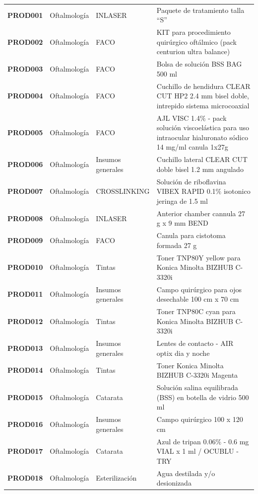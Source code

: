 \begin{longtable}{p{2cm} p{2cm} p{3.1cm} p{6.5cm}}
        \hline
        \textbf{PROD001} & Oftalmología & INLASER & Paquete de tratamiento talla ``S'' \\
        \textbf{PROD002} & Oftalmología & FACO & KIT para procedimiento quirúrgico oftálmico (pack centurion ultra balance) \\
        \textbf{PROD003} & Oftalmología & FACO & Bolsa de solución BSS BAG 500 ml \\
        \textbf{PROD004} & Oftalmología & FACO & Cuchillo de hendidura CLEAR CUT HP2 2.4 mm bisel doble, intrepido sistema microcoaxial \\
        \textbf{PROD005} & Oftalmología & FACO & AJL VISC 1.4$\%$ - pack solución viscoelástica para uso intraocular hialuronato sódico 14 mg/ml canula 1x27g \\
        \textbf{PROD006} & Oftalmología & Insumos generales & Cuchillo lateral CLEAR CUT doble bisel 1.2 mm angulado \\
        \textbf{PROD007} & Oftalmología & CROSSLINKING & Solución de riboflavina VIBEX RAPID 0.1$\%$ isotonico jeringa de 1.5 ml \\
        \textbf{PROD008} & Oftalmología & INLASER & Anterior chamber cannula 27 g x 9 mm BEND \\
        \textbf{PROD009} & Oftalmología & FACO & Canula para cistotoma formada 27 g \\
        \textbf{PROD010} & Oftalmología & Tintas & Toner TNP80Y yellow para Konica Minolta BIZHUB C-3320i \\
        \textbf{PROD011} & Oftalmología & Insumos generales & Campo quirúrgico para ojos desechable 100 cm x 70 cm \\
        \textbf{PROD012} & Oftalmología & Tintas & Toner TNP80C cyan para Konica Minolta BIZHUB C-3320i \\
        \textbf{PROD013} & Oftalmología & Insumos generales & Lentes de contacto - AIR optix dia y noche \\
        \textbf{PROD014} & Oftalmología & Tintas & Toner Konica Minolta BIZHUB C-3320i Magenta \\
        \textbf{PROD015} & Oftalmología & Catarata & Solución salina equilibrada (BSS) en botella de vidrio 500 ml \\
        \textbf{PROD016} & Oftalmología & Insumos generales & Campo quirúrgico 100 x 120 cm \\
        \textbf{PROD017} & Oftalmología & Catarata & Azul de tripan 0.06$\%$ - 0.6 mg VIAL x 1 ml / OCUBLU - TRY \\
        \textbf{PROD018} & Oftalmología & Esterilización & Agua destilada y/o desionizada \\
        \hline
\end{longtable}

